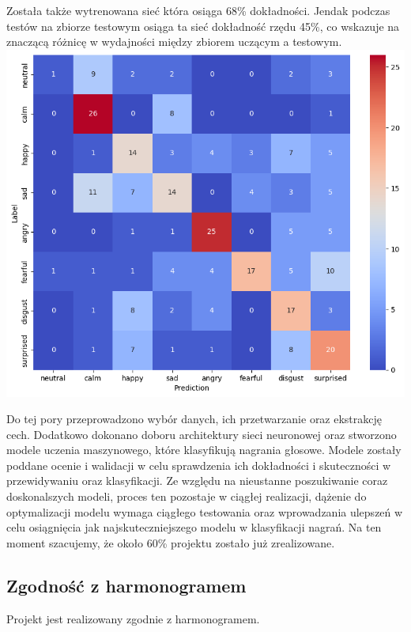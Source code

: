 \documentclass[12pt,titlepage]{article}
\begin{document}
Została także wytrenowana sieć która osiąga 68\% dokładności. Jendak podczas testów na zbiorze testowym osiąga ta sieć dokładność rzędu 45\%, co wskazuje na znaczącą różnicę w wydajności między zbiorem uczącym a testowym.\\

\includegraphics[width=\linewidth]{img/error_matrix.png}

Do tej pory przeprowadzono wybór danych, ich przetwarzanie oraz ekstrakcję cech. Dodatkowo dokonano doboru architektury sieci neuronowej oraz stworzono modele uczenia maszynowego, które klasyfikują nagrania głosowe. Modele zostały poddane ocenie i walidacji w celu sprawdzenia ich dokładności i skuteczności w przewidywaniu oraz klasyfikacji. Ze względu na nieustanne poszukiwanie coraz doskonalszych modeli, proces ten pozostaje w ciągłej realizacji, dążenie do optymalizacji modelu wymaga ciągłego testowania oraz wprowadzania ulepszeń w celu osiągnięcia jak najskuteczniejszego modelu w klasyfikacji nagrań. Na ten moment szacujemy, że około 60\% projektu zostało już zrealizowane.

\subsection*{Zgodność z harmonogramem}
Projekt jest realizowany zgodnie z harmonogramem.\\
\end{document}
